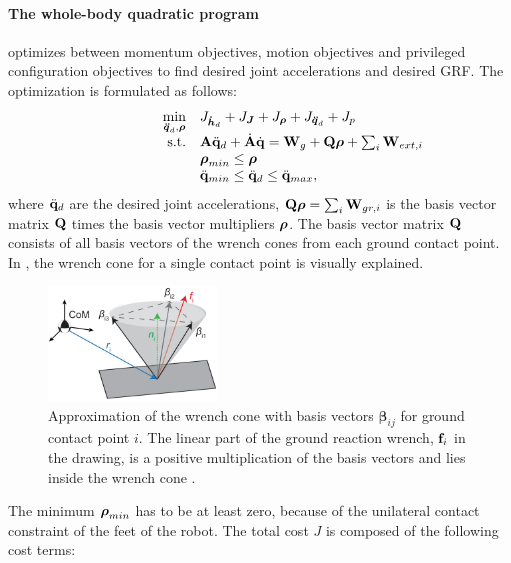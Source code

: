 \paragraph{The whole-body quadratic program} \cite{koolen2016design} optimizes between momentum objectives, motion objectives and privileged configuration objectives to find desired joint accelerations and desired \ac{GRF}. The optimization is formulated as follows:
\begin{equation}
\begin{array}{rlcl}
\displaystyle \min_{\bs{\ddot{q}}_d,\bs{\rho}} & \multicolumn{3}{l}{J_{\bs{\dot{h}}_d} + J_{\bs{J}} + J_{\bs{\rho}} + J_{\bs{\ddot{q}}_d}  + J_p} \\
\textrm{s.t.} & \matr{A}\ddqjntd + \dot{\matr{A}}\dqjnt = \matr{W}_g + \matr{Q}\bs{\rho}+\sum_i\matr{W}_{ext,i}\\
&\displaystyle \bs{\rho}_{min} \leq \bs{\rho}\\
&\ddot{\qjnt}_{min} \leq \ddqjntd \leq \ddot{\qjnt}_{max},
\end{array}
\end{equation}
where $\ddot{\mathbf{q}}_d$ are the desired joint accelerations, $\mathbf{Q}\boldsymbol{\rho} = \sum_i\mathbf{W}_{gr,i}$ is the basis vector matrix $\mathbf{Q}$ times the basis vector multipliers $\boldsymbol{\rho}$. The basis vector matrix $\mathbf{Q}$ consists of all basis vectors of the wrench cones from each ground contact point. In , the wrench cone for a single contact point is visually explained.
\begin{figure}[h]
\centering
\includegraphics[width=0.4\textwidth]{STYLESTUFF/wrenchcone.png}
\caption{Approximation of the wrench cone with basis vectors $\boldsymbol{\beta}_{ij}$ for ground contact point $i$. The linear part of the ground reaction wrench, $\mathbf{f}_i$ in the drawing, is a positive multiplication of the basis vectors and lies inside the wrench cone \cite{koolen2016design}. }
\label{fig:wrenchcone}
\end{figure}
The minimum $\boldsymbol{\rho}_{min}$ has to be at least zero, because of the unilateral contact constraint of the feet of the robot. The total cost $J$ is composed of the following cost terms:
